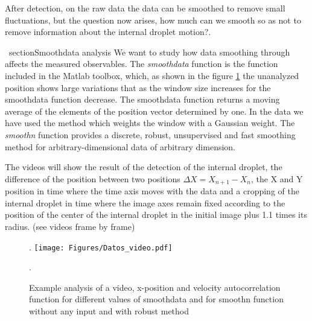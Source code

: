 \documentclass[%
10pt,
superscriptaddress,
twocolumn,
 amsmath,amssymb,
 aps,prx,
]{revtex4-2}
\begin{document}
After detection, on the raw data the data can be smoothed to remove small fluctuations, but the question now arises, how much can we smooth so as not to remove information about the internal droplet motion?.

\ section{Smoothdata analysis}
\label{smoothdata}
We want to study how data smoothing through affects the measured observables. The \textit{smoothdata} function is the function included in the Matlab toolbox, which, as shown in the figure \ref{Datos_videos} the unanalyzed position shows large variations that as the window size increases for the smoothdata function decrease. The smoothdata function returns a moving average of the elements of the position vector determined by one. In the data we have used the  method which weights the window with a Gaussian weight.
The \textit{smoothn} function provides a discrete, robust, unsupervised and fast smoothing method for arbitrary-dimensional data of arbitrary dimension.

The videos will show the result of the detection of the internal droplet, the difference of the position between two positions $\Delta X = X_{n+1}-X_{n}$, the X and Y position in time where the time axis moves with the data and a cropping of the internal droplet in time where the image axes remain fixed according to the position of the center of the internal droplet in the initial image plus 1.1 times its radius. (see videos frame by frame)
\begin{figure}[b].
	\texttt{[image: Figures/Datos\_video.pdf]}
	\caption{Example analysis of a video, x-position and velocity autocorrelation function for different values of smoothdata and for smoothn function without any input and with robust method}.
	\label{Datos_videos}
\end{figure}
\newpage
\onecolumngrid
\end{document}
